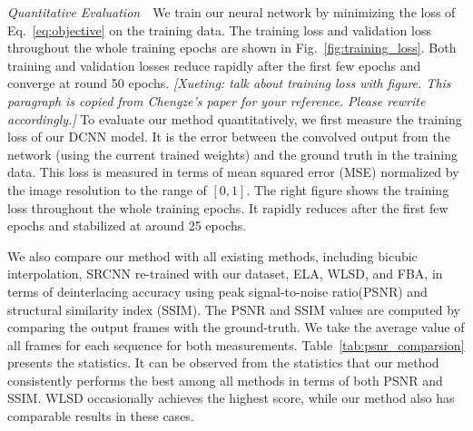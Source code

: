 \vspace{0.15in}
\noindent\emph{Quantitative Evaluation}\,\,\,\,
We train our neural network by minimizing the loss of Eq.~\ref{eq:objective} on the training data. 
The training loss and validation loss throughout the whole training epochs are shown in Fig.~\ref{fig:training_loss}. 
Both training and validation losses reduce rapidly after the first few epochs and converge at round 50 epochs.
{\color{red} {\em [Xueting: talk about training loss with figure. This paragraph is copied from Chengze's paper for your reference. Please rewrite accordingly.]} To evaluate our method quantitatively, we first measure the training
loss of our DCNN model. It is the error between the convolved output from the network
(using the current trained weights) and the ground truth in the training data.
This loss is measured in terms of mean squared error (MSE)
normalized by the image resolution to the range of $[0, 1]$.
The right figure shows the training loss throughout the whole training epochs.
It rapidly reduces after the first few epochs and stabilized at around 25 epochs.}
\fi

We also compare our method with all existing methods, including bicubic interpolation, SRCNN re-trained with our dataset, ELA, WLSD, and FBA, in terms of deinterlacing accuracy using peak signal-to-noise ratio(PSNR) and structural similarity index (SSIM). The PSNR and SSIM values are computed by comparing the output frames with the ground-truth. We take the average value of all frames for each sequence for both measurements. Table~\ref{tab:psnr_comparsion} presents the statistics. It can be observed from the statistics that our method consistently performs the best among all methods in terms of both PSNR and SSIM. WLSD occasionally achieves the highest score, while our method also has comparable results in these cases.

